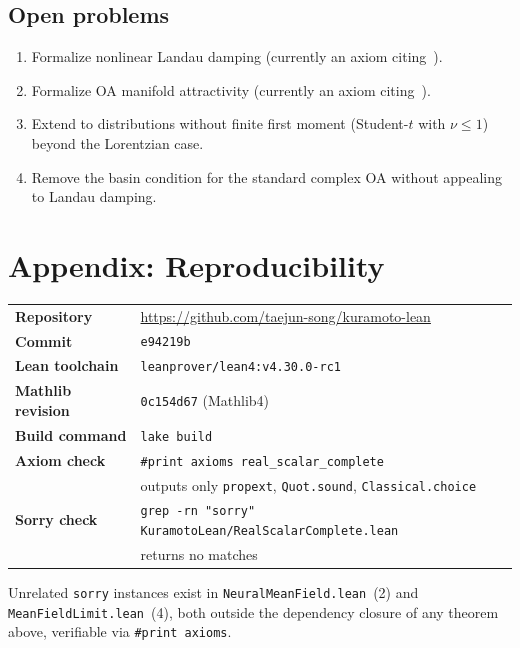 \documentclass[11pt,a4paper]{article}
\theoremstyle{definition}
\begin{document}
\subsection{Open problems}

\begin{enumerate}
\item Formalize nonlinear Landau damping (currently an axiom citing~\cite{dietert2017}).
\item Formalize OA manifold attractivity (currently an axiom citing~\cite{dietert-fernandez2018}).
\item Extend to distributions without finite first moment (Student-$t$ with $\nu\leq 1$) beyond the Lorentzian case.
\item Remove the basin condition for the standard complex OA without appealing to Landau damping.
\end{enumerate}

\section*{Appendix: Reproducibility}

\begin{tabular}{ll}
\textbf{Repository} & \url{https://github.com/taejun-song/kuramoto-lean} \\
\textbf{Commit} & \texttt{e94219b} \\
\textbf{Lean toolchain} & \texttt{leanprover/lean4:v4.30.0-rc1} \\
\textbf{Mathlib revision} & \texttt{0c154d67} (Mathlib4) \\
\textbf{Build command} & \texttt{lake build} \\
\textbf{Axiom check} & \texttt{\#print axioms real\_scalar\_complete} \\
& outputs only \texttt{propext}, \texttt{Quot.sound}, \texttt{Classical.choice} \\
\textbf{Sorry check} & \texttt{grep -rn "sorry" KuramotoLean/RealScalarComplete.lean} \\
& returns no matches
\end{tabular}

\medskip\noindent Unrelated \texttt{sorry} instances exist in \texttt{NeuralMeanField.lean}~(2) and \texttt{MeanFieldLimit.lean}~(4), both outside the dependency closure of any theorem above, verifiable via \texttt{\#print axioms}.
\end{document}
